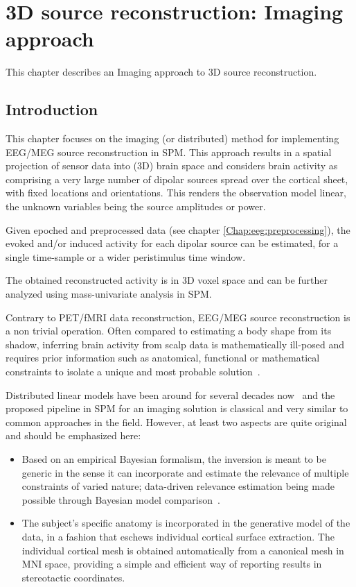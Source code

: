 \chapter{3D source reconstruction: Imaging approach \label{Chap:eeg:imaging}}

This chapter describes an Imaging approach to 3D source reconstruction.

\section{Introduction\label{sec:imaginv_intro}}
This chapter focuses on the imaging (or distributed) method for implementing EEG/MEG source reconstruction in SPM. This approach results in a spatial projection of sensor data into (3D) brain space and considers brain activity as comprising a very large number of dipolar sources spread over the cortical sheet, with fixed locations and orientations. This renders the observation model linear, the unknown variables being the source amplitudes or power.

Given epoched and preprocessed data (see chapter \ref{Chap:eeg:preprocessing}), the evoked and/or induced activity for each dipolar source can be estimated, for a single time-sample or a wider peristimulus time window.

The obtained reconstructed activity is in 3D voxel space and can be further analyzed using mass-univariate analysis in SPM.

Contrary to PET/fMRI data reconstruction, EEG/MEG source reconstruction is a non trivial operation. Often compared to estimating a body shape from its shadow, inferring brain activity from scalp data is mathematically ill-posed and requires prior information such as anatomical, functional or mathematical constraints to isolate a unique and most probable solution~\cite{Baillet01}.

Distributed linear models have been around for several decades now~\cite{Dale93} and the proposed pipeline in SPM for an imaging solution is classical and very similar to common approaches in the field. However, at least two aspects are quite original and should be emphasized here:

\begin{itemize}
\item Based on an empirical Bayesian formalism, the inversion is meant to be generic in the sense it can incorporate and estimate the relevance of multiple constraints of varied nature; data-driven relevance estimation being made possible through Bayesian model comparison~\cite{peb1,cp_empirical_eeg,jm_multiple,karl_induced}.
\item The subject's specific anatomy is incorporated in the generative model of the data, in a fashion that eschews individual cortical surface extraction. The individual cortical mesh is obtained automatically from a canonical mesh in MNI space, providing a simple and efficient way of reporting results in stereotactic coordinates.
\end{itemize}

